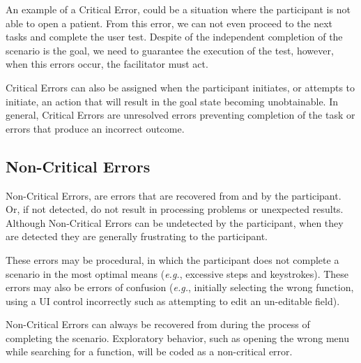 An example of a Critical Error, could be a situation where the participant is not able to open a patient. From this error, we can not even proceed to the next tasks and complete the user test. Despite of the independent completion of the scenario is the goal, we need to guarantee the execution of the test, however, when this errors occur, the facilitator must act.

Critical Errors can also be assigned when the participant initiates, or attempts to initiate, an action that will result in the goal state becoming unobtainable. In general, Critical Errors are unresolved errors preventing completion of the task or errors that produce an incorrect outcome.

\subsection{Non-Critical Errors}

Non-Critical Errors, are errors that are recovered from and by the participant. Or, if not detected, do not result in processing problems or unexpected results. Although Non-Critical Errors can be undetected by the participant, when they are detected they are generally frustrating to the participant.

These errors may be procedural, in which the participant does not complete a scenario in the most optimal means ({\it e.g.}, excessive steps and keystrokes). These errors may also be errors of confusion ({\it e.g.}, initially selecting the wrong function, using a UI control incorrectly such as attempting to edit an un-editable field).

Non-Critical Errors can always be recovered from during the process of completing the scenario. Exploratory behavior, such as opening the wrong menu while searching for a function, will be coded as a non-critical error.
